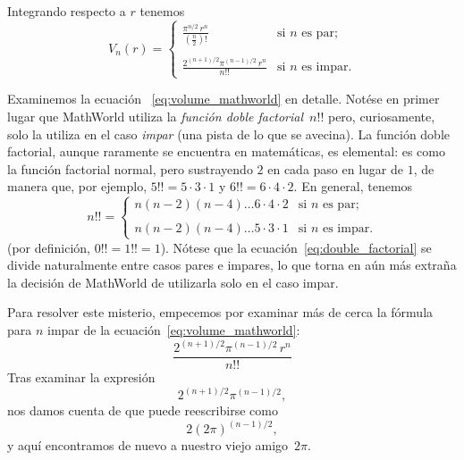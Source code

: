 Integrando respecto a $r$ tenemos
\begin{equation}
\label{eq:volume_mathworld}
V_n(r) = \begin{cases}
\displaystyle \frac{\pi^{n/2}\,r^n}{(\frac{n}{2})!} & \text{si } n \text{ es par}; \\ \\
\displaystyle \frac{2^{(n+1)/2}\pi^{(n-1)/2}\,r^n}{n!!} & \text{si } n \text{ es impar}.
\end{cases}
\end{equation}

Examinemos la ecuación ~\eqref{eq:volume_mathworld} en detalle. Notése en primer lugar que MathWorld utiliza la \emph{función doble factorial}~$n!!$ pero, curiosamente, solo la utiliza en el caso \emph{impar} (una pista de lo que se avecina). La función doble factorial, aunque raramente se encuentra en matemáticas, es elemental: es como la función factorial normal, pero sustrayendo $2$ en cada paso en lugar de $1$, de manera que, por ejemplo, $5!! = 5 \cdot 3 \cdot 1$ y $6!! = 6 \cdot 4 \cdot 2$. En general, tenemos 
\begin{equation}
\label{eq:double_factorial}
n!! = \begin{cases}
n(n-2)(n-4)\ldots6\cdot4\cdot2 & \text{si } n \text{ es par}; \\ \\
n(n-2)(n-4)\ldots5\cdot3\cdot1 & \text{si } n \text{ es impar}.
\end{cases}
\end{equation}
(por definición, $0!! = 1!! = 1$). Nótese que la ecuación~\eqref{eq:double_factorial} se divide naturalmente entre casos pares e impares, lo que torna en aún más extraña la decisión de MathWorld de utilizarla solo en el caso impar.

Para resolver este misterio, empecemos por examinar más de cerca la fórmula para $n$ impar de la ecuación~\eqref{eq:volume_mathworld}:
\[ \frac{2^{(n+1)/2}\pi^{(n-1)/2}\,r^n}{n!!} \]
Tras examinar la expresión
\[ 2^{(n+1)/2}\pi^{(n-1)/2}, \]
nos damos cuenta de que puede reescribirse como
\[ 2(2\pi)^{(n-1)/2}, \]
y aquí encontramos de nuevo a nuestro viejo amigo~$2\pi$.

